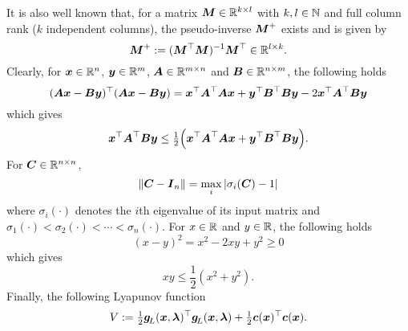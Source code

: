 \documentclass[journal]{IEEEtranTIE}
\begin{document}
%
It is also well known \cite{anton2003contemporary} that, for a matrix $\boldsymbol{M} \in \mathbb{R}^{k \times l}$ with $k,l \in \mathbb{N}$ and full column rank ($k$ independent columns), the pseudo-inverse  $\boldsymbol{M}^+$ exists and is given by 
%
\begin{equation}
    \mm{M}^+ :=(\mm{M}^\top\mm{M})^{-1} \mm{M}^\top \in \R^{l \times k}.
    \label{eq:pseudo-inverse for matrix with full column rank}
\end{equation}
%
Clearly, for $\boldsymbol{x}\in \mathbb{R}^n$, $\boldsymbol{y}\in \mathbb{R}^m$, $\boldsymbol{A} \in \mathbb{R}^{m \times n}$ and   $\boldsymbol{B} \in \mathbb{R}^{n \times m}$, the following holds
$$
(\boldsymbol{A}\boldsymbol{x} - \boldsymbol{B}\boldsymbol{y})^\top (\boldsymbol{A}\boldsymbol{x} - \boldsymbol{B}\boldsymbol{y}) = \boldsymbol{x}^\top \boldsymbol{A}^\top\boldsymbol{A}\boldsymbol{x} +  \boldsymbol{y}^\top \boldsymbol{B}^\top\boldsymbol{B}\boldsymbol{y} - 2 \boldsymbol{x}^\top \boldsymbol{A}^\top\boldsymbol{B}\boldsymbol{y} 
$$
which gives
%
\begin{equation}
\mv{x}^\top \mm{A}^\top\mm{B}\mv{y} \leq \tfrac{1}{2}\Big( \mv{x}^\top \mm{A}^\top\mm{A}\mv{x} +  \mv{y}^\top \mm{B}^\top\mm{B}\mv{y} \Big).
\label{eq:(binomial) matrix inequality}
\end{equation}
For $\boldsymbol{C} \in \mathbb{R}^{n \times n}$,
\begin{equation}
\left\| \mm{C} - \mm{I}_n \right\| = {\max _i}\left| {{\sigma _i}(\mm{C}) - 1} \right|
\label{eq:matrix norm inequality}
\end{equation}
where $\sigma_i(\cdot)$ denotes the $i$th eigenvalue of its input matrix and $\sigma_1(\cdot) < \sigma_2(\cdot) < \cdots < \sigma_n(\cdot)$.
%
For $x \in \mathbb{R}$ and $y \in \mathbb{R}$, the following holds
$$
(x - y)^2 = x^2 - 2xy + y^2 \ge 0
$$
which gives
\begin{equation}
xy \le \frac{1}{2}(x^2 + y^2).
\label{eq:real number inequality}
\end{equation}
Finally, the following Lyapunov function 
%
\begin{align}\label{eq:V}
V := \tfrac{1}{2}\mv{g}_{\!L}(\mv{x},\mv{\lambda})^\top \mv{g}_{\!L}(\mv{x},\mv{\lambda}) + \tfrac{1}{2}\mv{c}(\mv{x})^\top\mv{c}(\mv{x}).
\end{align}
%
\end{document}
